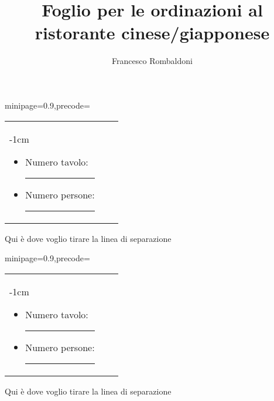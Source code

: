 \documentclass[hidelinks,12pt,a4paper]{article}
\newcommand{\backGroundImage}{
example-image
}
\newcommand{\orderSheet}{
	
	\begin{center}
		\fboxrule=2pt
		\begin{adjustbox}{minipage=0.9\textwidth,precode=\dbox}
				\begin{roundCornerPage}[roundcorner=15pt]
					\begin{minipage}[t][0.7\textwidth][t]{\textwidth}
						
							\begin{minipage}[t][0.15\textwidth][t]{\textwidth}
									\begin{tabularx}{\textwidth}{XXX}
										{
											\begin{adjustwidth}{-1cm}{}
											\begin{itemize}
												\item[] Numero tavolo: \rule{8mm}{0.15mm}
												\item[] Numero persone: \rule{8mm}{0.15mm}
											\end{itemize}
										\end{adjustwidth}
											
										}&{
										
										}&{
											
										}
									\end{tabularx}
							\end{minipage}
							
							Qui è dove voglio tirare la linea di separazione
					\end{minipage}
				\end{roundCornerPage}
		\end{adjustbox}
	\end{center}

	
}
\begin{document}
	
	\pagestyle{empty}
	
	\title{\textbf{Foglio per le ordinazioni al ristorante cinese/giapponese}}
	\author{Francesco Rombaldoni}
	\date{}
	
	\maketitle
	\newpage
	
	
	
	
	\orderSheet
	\vspace*{5mm}
	\orderSheet
	
	
	\newpage
	\vspace*{\fill}
	\begin{center}
		\begin{minipage}{0.8\linewidth}
			\doclicenseThis
		\end{minipage}
	\end{center}
	
\end{document}
